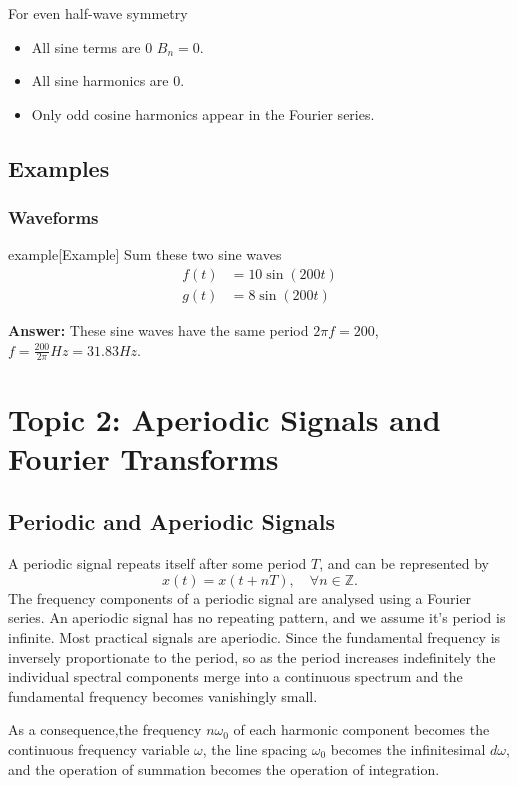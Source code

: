 \documentclass{article}
\begin{document}
For even half-wave symmetry
\begin{itemize}
    \item All sine terms are 0 $B_n=0$.
    \item All sine harmonics are 0.
    \item Only odd cosine harmonics appear in the Fourier series.
\end{itemize}

\subsection{Examples}
\subsubsection{Waveforms}
\begin{callout}{example}[Example]
\label{example:eg1-1}
Sum these two sine waves
\begin{align*}
    f(t) &= 10\sin(200t) \\
    g(t) &= 8\sin(200t)
\end{align*}

\textbf{Answer:}
These sine waves have the same period $2\pi f=200$, $f=\frac{200}{2\pi }Hz=31.83Hz$.
\end{callout}

\section{Topic 2: Aperiodic Signals and Fourier Transforms}
\subsection{Periodic and Aperiodic Signals}
A periodic signal repeats itself after some period $T$, and can be represented by
\[
    x(t)=x(t+nT),\quad \forall n \in \mathbb{Z}.
\]
The frequency components of a periodic signal are analysed using a Fourier series. An aperiodic signal has no repeating pattern, and we assume it's period is infinite. Most practical signals are aperiodic. Since the fundamental frequency is inversely proportionate to the period, so as the period increases indefinitely the individual spectral components merge into a continuous spectrum and the fundamental frequency becomes vanishingly small.

As a consequence,the frequency $n\omega _0$ of each harmonic component becomes the continuous frequency variable $\omega $, the line spacing $\omega _0$ becomes the infinitesimal $d\omega $, and the operation of summation becomes the operation of integration.
\end{document}
